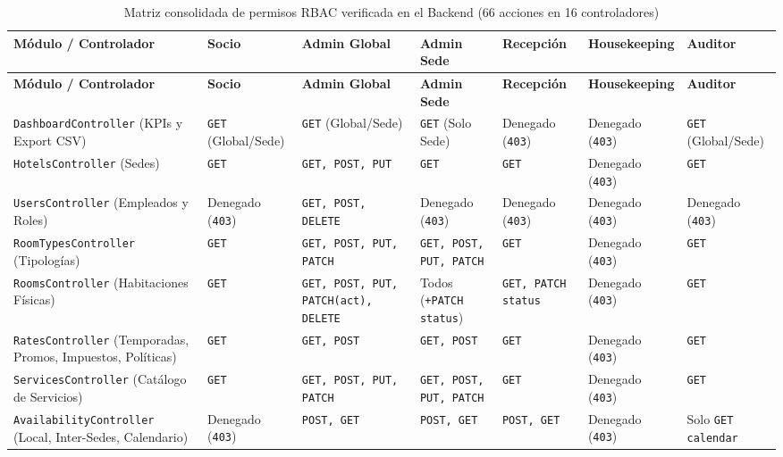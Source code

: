 \documentclass[12pt,a4paper]{article}
\begin{document}
\begin{longtable}{p{2.9cm} p{1.6cm} p{1.8cm} p{1.7cm} p{1.9cm} p{1.8cm} p{1.6cm}}
\caption{Matriz consolidada de permisos RBAC verificada en el Backend (66 acciones en 16 controladores)}
\label{tab:matriz_rbac_resumen}\\
\toprule
\textbf{M\'odulo / Controlador} & \textbf{Socio} & \textbf{Admin Global} & \textbf{Admin Sede} & \textbf{Recepci\'on} & \textbf{House\-keeping} & \textbf{Auditor}\\
\midrule
\endfirsthead
\toprule
\textbf{M\'odulo / Controlador} & \textbf{Socio} & \textbf{Admin Global} & \textbf{Admin Sede} & \textbf{Recepci\'on} & \textbf{House\-keeping} & \textbf{Auditor}\\
\midrule
\endhead
\bottomrule
\endfoot
\texttt{DashboardController} (KPIs y Export CSV) & \texttt{GET} (Global/Sede) & \texttt{GET} (Global/Sede) & \texttt{GET} (Solo Sede) & Denegado (\texttt{403}) & Denegado (\texttt{403}) & \texttt{GET} (Global/Sede)\\[0.12cm]
\texttt{HotelsController} (Sedes) & \texttt{GET} & \texttt{GET, POST, PUT} & \texttt{GET} & \texttt{GET} & Denegado (\texttt{403}) & \texttt{GET}\\[0.12cm]
\texttt{UsersController} (Empleados y Roles) & Denegado (\texttt{403}) & \texttt{GET, POST, DELETE} & Denegado (\texttt{403}) & Denegado (\texttt{403}) & Denegado (\texttt{403}) & Denegado (\texttt{403})\\[0.12cm]
\texttt{RoomTypesController} (Tipolog\'ias) & \texttt{GET} & \texttt{GET, POST, PUT, PATCH} & \texttt{GET, POST, PUT, PATCH} & \texttt{GET} & Denegado (\texttt{403}) & \texttt{GET}\\[0.12cm]
\texttt{RoomsController} (Habitaciones F\'isicas) & \texttt{GET} & \texttt{GET, POST, PUT, PATCH(act), DELETE} & Todos (\texttt{+PATCH status}) & \texttt{GET, PATCH status} & Denegado (\texttt{403}) & \texttt{GET}\\[0.12cm]
\texttt{RatesController} (Temporadas, Promos, Impuestos, Pol\'iticas) & \texttt{GET} & \texttt{GET, POST} & \texttt{GET, POST} & \texttt{GET} & Denegado (\texttt{403}) & \texttt{GET}\\[0.12cm]
\texttt{ServicesController} (Cat\'alogo de Servicios) & \texttt{GET} & \texttt{GET, POST, PUT, PATCH} & \texttt{GET, POST, PUT, PATCH} & \texttt{GET} & Denegado (\texttt{403}) & \texttt{GET}\\[0.12cm]
\texttt{AvailabilityController} (Local, Inter-Sedes, Calendario) & Denegado (\texttt{403}) & \texttt{POST, GET} & \texttt{POST, GET} & \texttt{POST, GET} & Denegado (\texttt{403}) & Solo \texttt{GET calendar}\\[0.12cm]

\end{longtable}
\end{document}
